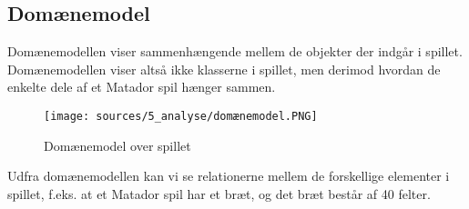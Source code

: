 \subsection{Domænemodel}
Domænemodellen viser sammenhængende mellem de objekter der indgår i spillet. Domænemodellen viser altså ikke klasserne i spillet, men derimod hvordan de enkelte dele af et Matador spil hænger sammen.

\begin{figure}[!h]
    \centering
    \texttt{[image: sources/5\_analyse/domænemodel.PNG]}
    \caption{Domænemodel over spillet}
    \label{fig:DM1}
\end{figure}

Udfra domænemodellen kan vi se relationerne mellem de forskellige elementer i spillet, f.eks. at et Matador spil har et bræt, og det bræt består af 40 felter.




